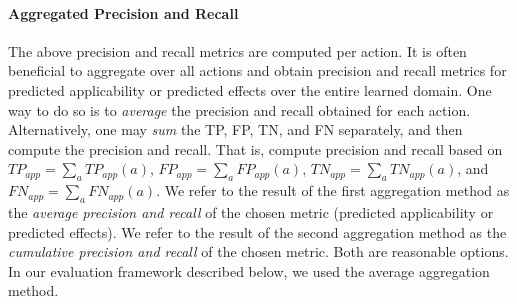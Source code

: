 \documentclass{article}
\theoremstyle{definition}
\theoremstyle{remark}
\newcommand{\app}{\ensuremath{\textit{app}}\xspace}
\newif\ifaddcomments
\newcommand{\roni}[1]{\ifaddcomments{\textcolor{red}{[Roni: #1]}}\fi}
\newcommand{\yarin}[1]{\ifaddcomments{\textcolor{teal}{[Yarin: #1]}}\fi}
\newcommand{\leo}[1]{\ifaddcomments{\textcolor{pink}{[Leonardo: #1]}}\fi}
\begin{document}
\roni{Add a concrete example of how to compute these metrics}
\yarin{I added example in section\_4\_example.tex, I don't think it's that good}


\paragraph{Aggregated Precision and Recall}

The above precision and recall metrics are computed per action. It is often beneficial to aggregate over all actions and obtain precision and recall metrics for predicted applicability or predicted effects over the entire learned domain. 
One way to do so is to \emph{average} the precision and recall obtained for each action. 
Alternatively, one may \emph{sum} the 
TP, FP, TN, and FN separately, and then compute the precision and recall. 
That is, compute precision and recall based on $TP_\app=\sum_a TP_\app(a)$, 
$FP_\app=\sum_a FP_\app(a)$,
$TN_\app=\sum_a TN_\app(a)$, and
$FN_\app=\sum_a FN_\app(a)$. 
We refer to the result of the first aggregation method as the \emph{average precision and recall} of the chosen metric (predicted applicability or predicted effects). 
We refer to the result of the second aggregation method as the \emph{cumulative precision and recall} of the chosen metric.  
Both are reasonable options. 
In our evaluation framework described below, we used the average aggregation method. 
\leo{For syntactic precision the `simple` one, this is because e.g. if there are 2 actions with 1 and 10 precs/effs resp., then the precision averaged over the two actions weights 1 mistake in the first action differently from 1 mistake in the second one, I am not sure we want this. For the predictive power metrics we aggregated using the `equal-action` method, this is because the number of samples can be very unbalanced (e.g. 1 vs 100). I do not think there is a `right` one, so I stored both metrics during the experiments and we can choose}
\roni{In the syntactic metrics this is not an issue because we measure based on the model, not the states in the test set. }
\end{document}
